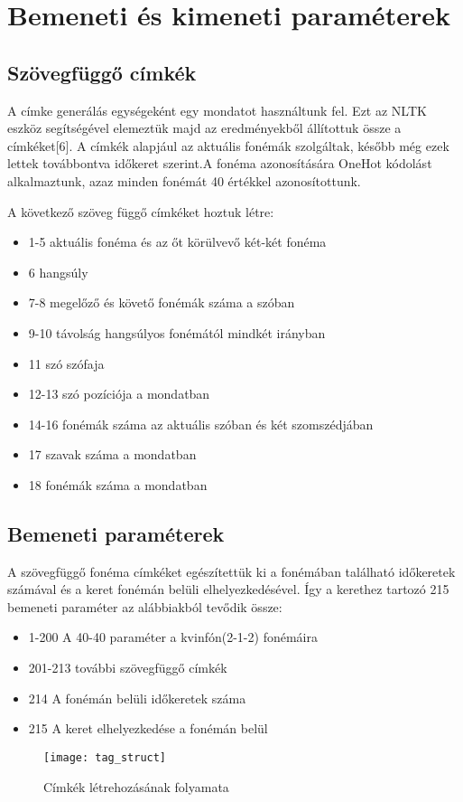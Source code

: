 \section{Bemeneti és kimeneti paraméterek}
\subsection{Szövegfüggő címkék}
A címke generálás egységeként egy mondatot használtunk fel. Ezt az NLTK eszköz segítségével elemeztük majd az eredményekből állítottuk össze a címkéket[6]. A címkék alapjául az aktuális fonémák szolgáltak, később még ezek lettek továbbontva időkeret szerint.A fonéma azonosítására OneHot kódolást alkalmaztunk, azaz minden fonémát 40 értékkel azonosítottunk.

A következő szöveg függő címkéket hoztuk létre:

\begin{itemize}
	\item 1-5 aktuális fonéma és az őt körülvevő két-két fonéma
	\item 6 hangsúly
	\item 7-8 megelőző és követő fonémák száma a szóban 
	\item 9-10 távolság hangsúlyos fonémától mindkét irányban
	\item 11 szó szófaja
	\item 12-13 szó pozíciója a mondatban
	\item 14-16 fonémák száma az aktuális szóban és két szomszédjában
	\item 17 szavak száma a mondatban
	\item 18 fonémák száma a mondatban
\end{itemize}

\subsection{Bemeneti paraméterek}
A szövegfüggő fonéma címkéket egészítettük ki a fonémában található időkeretek számával és a keret fonémán belüli elhelyezkedésével. Így a kerethez tartozó 215 bemeneti paraméter az alábbiakból tevődik össze:

\begin{itemize}
	\item 1-200 A 40-40 paraméter a kvinfón(2-1-2) fonémáira
	\item 201-213 további szövegfüggő címkék
	\item 214 A fonémán belüli időkeretek száma
	\item 215 A keret elhelyezkedése a fonémán belül
\end{itemize} 
\begin{figure}[h]
	\par\centering
	\texttt{[image: tag\_struct]}
	\caption{Címkék létrehozásának folyamata}
\end{figure}

